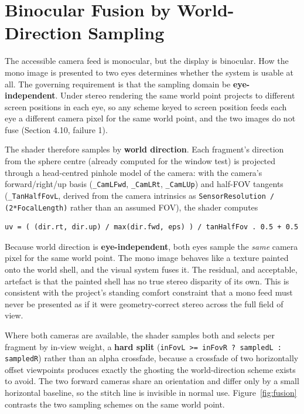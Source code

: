 
\section{Binocular Fusion by World-Direction Sampling}

The accessible camera feed is monocular, but the display is binocular. How the mono image is presented
to two eyes determines whether the system is usable at all. The governing requirement is that the
sampling domain be \textbf{eye-independent}. Under stereo rendering the same world point projects to
different screen positions in each eye, so any scheme keyed to screen position feeds each eye a
different camera pixel for the same world point, and the two images do not fuse (Section 4.10,
failure 1).

The shader therefore samples by \textbf{world direction}. Each fragment's direction from the
sphere centre (already computed for the window test) is projected through a head-centred pinhole
model of the camera: with the camera's forward/right/up basis (\verb|_CamLFwd|, \verb|_CamLRt|, \verb|_CamLUp|) and
half-FOV tangents (\verb|_TanHalfFovL|, derived from the camera intrinsics as
\verb|SensorResolution / (2*FocalLength)| rather than an assumed FOV), the shader computes

\begin{verbatim}
uv = ( (dir.rt, dir.up) / max(dir.fwd, eps) ) / tanHalfFov . 0.5 + 0.5
\end{verbatim}

Because world direction is \textbf{eye-independent}, both eyes sample the \textit{same} camera pixel for the
same world point. The mono image behaves like a texture painted onto the world shell, and the visual
system fuses it. The residual, and acceptable, artefact is that the painted shell has no true
stereo disparity of its own. This is consistent with the project's standing comfort constraint that a
mono feed must never be presented as if it were geometry-correct stereo across the full field of view.

Where both cameras are available, the shader samples both and selects per fragment by in-view
weight, a \textbf{hard split} (\verb|inFovL >= inFovR ? sampledL : sampledR|) rather than an alpha crossfade,
because a crossfade of two horizontally offset viewpoints produces exactly the ghosting the
world-direction scheme exists to avoid. The two forward cameras share an orientation and differ only
by a small horizontal baseline, so the stitch line is invisible in normal use.
Figure~\ref{fig:fusion} contrasts the two sampling schemes on the same world point.

